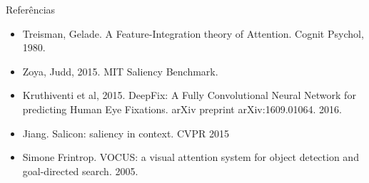 \documentclass[10pt]{beamer}
\begin{document}
\begin{frame}{Referências}
    \begin{itemize}
        \item Treisman, Gelade. A Feature-Integration theory of Attention.
            Cognit Psychol, 1980.
        \item Zoya, Judd, 2015. MIT Saliency Benchmark.
        \item Kruthiventi et al, 2015. DeepFix: A Fully Convolutional Neural
            Network for predicting Human Eye Fixations.
            arXiv preprint arXiv:1609.01064. 2016.
        \item Jiang. Salicon: saliency in context. CVPR 2015
        \item Simone Frintrop.
            VOCUS: a visual attention system for object detection and
            goal-directed search.
            2005.
    \end{itemize}
\end{frame}
\end{document}
